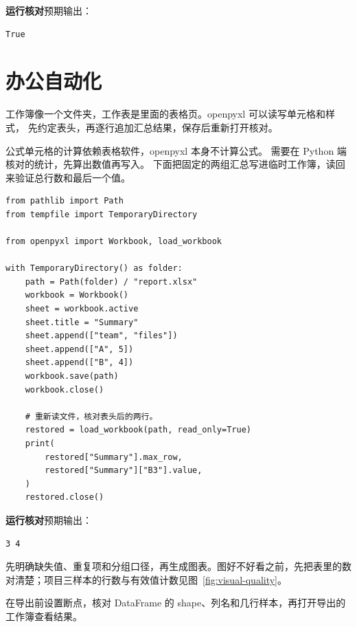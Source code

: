 \textbf{运行核对}\enspace 预期输出：
\begin{lstlisting}[language={},numbers=none]
True
\end{lstlisting}

\par


\section{办公自动化}

工作簿像一个文件夹，工作表是里面的表格页。openpyxl 可以读写单元格和样式，
先约定表头，再逐行追加汇总结果，保存后重新打开核对。

公式单元格的计算依赖表格软件，openpyxl 本身不计算公式。
需要在 Python 端核对的统计，先算出数值再写入。
下面把固定的两组汇总写进临时工作簿，读回来验证总行数和最后一个值。


\begin{lstlisting}[title={\code{write_workbook.py}}]
from pathlib import Path
from tempfile import TemporaryDirectory

from openpyxl import Workbook, load_workbook

with TemporaryDirectory() as folder:
    path = Path(folder) / "report.xlsx"
    workbook = Workbook()
    sheet = workbook.active
    sheet.title = "Summary"
    sheet.append(["team", "files"])
    sheet.append(["A", 5])
    sheet.append(["B", 4])
    workbook.save(path)
    workbook.close()

    # 重新读文件，核对表头后的两行。
    restored = load_workbook(path, read_only=True)
    print(
        restored["Summary"].max_row,
        restored["Summary"]["B3"].value,
    )
    restored.close()
\end{lstlisting}


\textbf{运行核对}\enspace 预期输出：
\begin{lstlisting}[language={},numbers=none]
3 4
\end{lstlisting}

\par

\begin{myunderstanding}
先明确缺失值、重复项和分组口径，再生成图表。图好不好看之前，先把表里的数对清楚；项目三样本的行数与有效值计数见图~\ref{fig:visual-quality}。
\end{myunderstanding}

\begin{pycharmpractice}
在导出前设置断点，核对 DataFrame 的 shape、列名和几行样本，再打开导出的工作簿查看结果。
\end{pycharmpractice}

